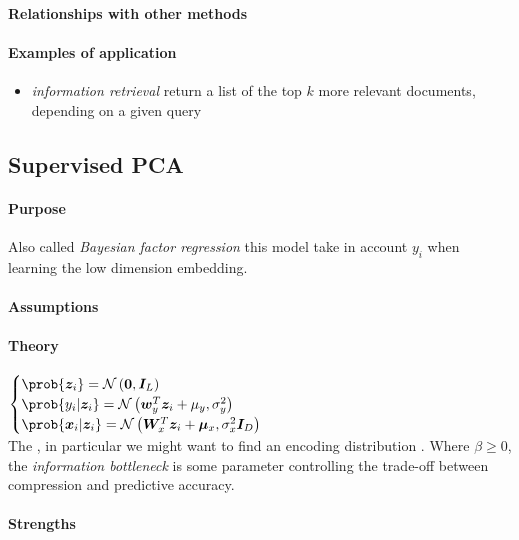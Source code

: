 \paragraph{Relationships with other methods}
\paragraph{Examples of application}
\begin{itemize}
    \item \emph{information retrieval} return a list of the top $k$ more relevant 
        documents, depending on a given query 
\end{itemize}

\subsection{Supervised PCA}
\paragraph{Purpose}
Also called \emph{Bayesian factor regression} this model take in account $y_{i}$ when
learning the low dimension embedding.
\paragraph{Assumptions}
\paragraph{Theory}
$\begin{cases}
    \prob{\bm{z}_{i}} = \mathcal{N}\left(\bm{0}, \bm{I}_{L}\right) \\
    \prob{y_{i}|\bm{z}_{i}} = \mathcal{N}\left(\bm{w}_{y}^{T}\bm{z}_{i}
    +\mu_{y},\sigma_{y}^{2}\right) \\
    \prob{\bm{x}_{i}|\bm{z}_{i}} = \mathcal{N}\left(\bm{W}_{x}^{T}\bm{z}_{i}
    +\bm{\mu}_{x},\sigma_{x}^{2}\bm{I}_{D}\right)
\end{cases}$\\
The , in particular we might want to find an encoding distribution
.
Where $\beta\geq 0$, the \emph{information bottleneck} is some parameter controlling 
the trade-off between compression and predictive accuracy.
\paragraph{Strengths}
